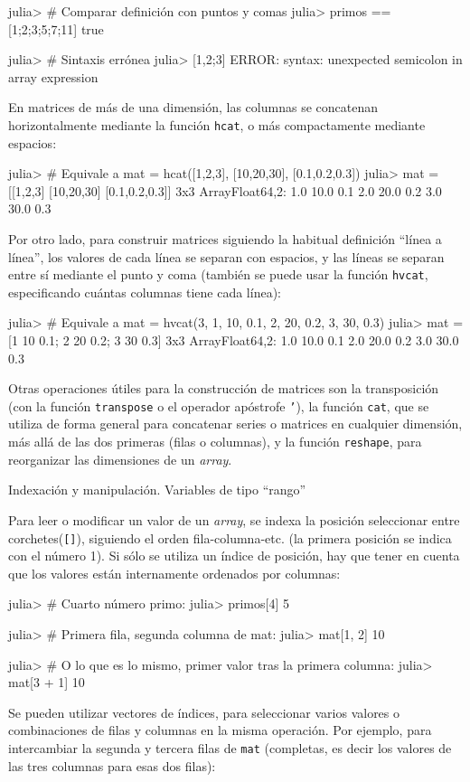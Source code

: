 ﻿\documentclass{article}
\newcommand{\code}{\texttt}
\begin{document}
julia> # Comparar definición con puntos y comas
julia> primos == [1;2;3;5;7;11]
true

julia> # Sintaxis errónea
julia> [1,2;3]
ERROR: syntax: unexpected semicolon in array expression

En matrices de más de una dimensión, las columnas se concatenan horizontalmente mediante la función \code{hcat}, o más compactamente mediante espacios:

julia> # Equivale a mat = hcat([1,2,3], [10,20,30], [0.1,0.2,0.3])
julia> mat = [[1,2,3] [10,20,30] [0.1,0.2,0.3]]
3x3 Array{Float64,2}:
 1.0 10.0 0.1
 2.0 20.0 0.2
 3.0 30.0 0.3

Por otro lado, para construir matrices siguiendo la habitual definición ``línea a línea'', los valores de cada línea se separan con espacios, y las líneas se separan entre sí mediante el punto y coma (también se puede usar la función \code{hvcat}, especificando cuántas columnas tiene cada línea):

julia> # Equivale a mat = hvcat(3, 1, 10, 0.1, 2, 20, 0.2, 3, 30, 0.3)
julia> mat = [1 10 0.1; 2 20 0.2; 3 30 0.3]
3x3 Array{Float64,2}:
 1.0 10.0 0.1
 2.0 20.0 0.2
 3.0 30.0 0.3

Otras operaciones útiles para la construcción de matrices son la transposición (con la función \code{transpose} o el operador apóstrofe \code{'}), la función \code{cat}, que se utiliza de forma general para concatenar series o matrices en cualquier dimensión, más allá de las dos primeras (filas o columnas), y la función \code{reshape}, para reorganizar las dimensiones de un \emph{array}.

Indexación y manipulación. Variables de tipo ``rango''

Para leer o modificar un valor de un \emph{array}, se indexa la posición seleccionar entre corchetes(\code{[]}), siguiendo el orden fila-columna-etc. (la primera posición se indica con el número 1). Si sólo se utiliza un índice de posición, hay que tener en cuenta que los valores están internamente ordenados por columnas:

julia> # Cuarto número primo:
julia> primos[4]
5

julia> # Primera fila, segunda columna de mat:
julia> mat[1, 2]
10

julia> # O lo que es lo mismo, primer valor tras la primera columna:
julia> mat[3 + 1]
10

Se pueden utilizar vectores de índices, para seleccionar varios valores o combinaciones de filas y columnas en la misma operación. Por ejemplo, para intercambiar la segunda y tercera filas de \code{mat} (completas, es decir los valores de las tres columnas para esas dos filas):
\end{document}

